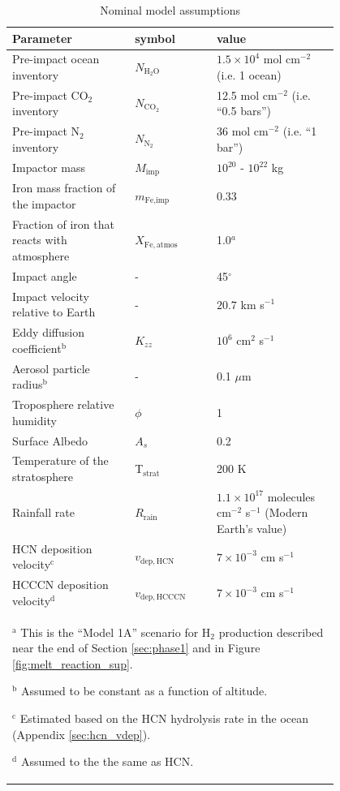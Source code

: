 \begin{table}
  \begin{center}
  \begin{tabularx}{0.9\linewidth}{p{0.3\linewidth} | p{0.2\linewidth} | p{0.3\linewidth}} \caption{Nominal model assumptions} \label{tab:fiducial_parameters} \\
    \hline \hline
    Parameter & symbol & value \\
    \hline
    Pre-impact ocean inventory & $N_\mathrm{H_2O}$ & $1.5 \times 10^4$ mol cm$^{-2}$ (i.e. 1 ocean) 
    \\
    Pre-impact CO$_2$ inventory & $N_\mathrm{CO_2}$ & 12.5 mol cm$^{-2}$ (i.e. ``0.5 bars'') 
    \\
    Pre-impact N$_2$ inventory & $N_\mathrm{N_2}$ & 36 mol cm$^{-2}$ (i.e. ``1 bar'') 
    \\
    Impactor mass & $M_\text{imp}$ & $10^{20}$ - $10^{22}$ kg
    \\
    Iron mass fraction of the impactor & $m_\text{Fe,imp}$ & 0.33 
    \\
    Fraction of iron that reacts with atmosphere & $X_\mathrm{Fe,atmos}$ & 1.0$^{a}$ 
    \\
    Impact angle & - & 45$^{\circ}$
    \\
    Impact velocity relative to Earth & - & $20.7$ km s$^{-1}$
    \\
    Eddy diffusion coefficient$^\text{b}$ & $K_{zz}$ & $10^6$ cm$^{2}$ s$^{-1}$ 
    \\
    Aerosol particle radius$^\text{b}$ & - & 0.1 $\mu$m
    \\
    Troposphere relative humidity & $\phi$ & 1 
    \\
    Surface Albedo & $A_s$ & 0.2 
    \\
    Temperature of the stratosphere & T$_\mathrm{strat}$ & 200 K 
    \\
    Rainfall rate & $R_\mathrm{rain}$ & $1.1 \times 10^{17}$ molecules cm$^{-2}$ s$^{-1}$  (Modern Earth's value) 
    \\
    HCN deposition velocity$^\text{c}$ & $v_\mathrm{dep,HCN}$ & $7 \times 10^{-3}$ cm s$^{-1}$
    \\
    HCCCN deposition velocity$^\text{d}$ & $v_\mathrm{dep,HCCCN}$ & $7 \times 10^{-3}$ cm s$^{-1}$
    \\
    \hline
    \multicolumn{3}{p{0.9\linewidth}}{
    $^\text{a}$ This is the ``Model 1A'' scenario for H$_2$ production described near the end of Section \ref{sec:phase1} and in Figure \ref{fig:melt_reaction_sup}.

    $^\text{b}$ Assumed to be constant as a function of altitude.

    $^\text{c}$ Estimated based on the HCN hydrolysis rate in the ocean (Appendix \ref{sec:hcn_vdep}).

    $^\text{d}$ Assumed to the the same as HCN.
  }
  \end{tabularx}
  \end{center}
\end{table}

